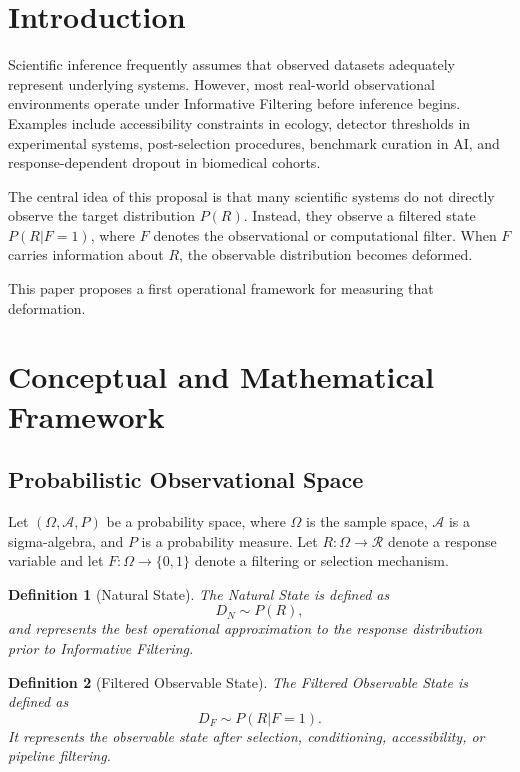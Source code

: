 \documentclass[11pt]{article}
\newtheorem{definition}{Definition}
\begin{document}
\section{Introduction}

Scientific inference frequently assumes that observed datasets adequately represent underlying systems. However, most real-world observational environments operate under Informative Filtering before inference begins. Examples include accessibility constraints in ecology, detector thresholds in experimental systems, post-selection procedures, benchmark curation in AI, and response-dependent dropout in biomedical cohorts.

The central idea of this proposal is that many scientific systems do not directly observe the target distribution $P(R)$. Instead, they observe a filtered state $P(R|F=1)$, where $F$ denotes the observational or computational filter. When $F$ carries information about $R$, the observable distribution becomes deformed.

This paper proposes a first operational framework for measuring that deformation.

\section{Conceptual and Mathematical Framework}

\subsection{Probabilistic Observational Space}

Let $(\Omega,\mathcal{A},P)$ be a probability space, where $\Omega$ is the sample space, $\mathcal{A}$ is a sigma-algebra, and $P$ is a probability measure. Let $R:\Omega\rightarrow\mathcal{R}$ denote a response variable and let $F:\Omega\rightarrow\{0,1\}$ denote a filtering or selection mechanism.

\begin{definition}[Natural State]
The Natural State is defined as
\[
D_N \sim P(R),
\]
and represents the best operational approximation to the response distribution prior to Informative Filtering.
\end{definition}

\begin{definition}[Filtered Observable State]
The Filtered Observable State is defined as
\[
D_F \sim P(R|F=1).
\]
It represents the observable state after selection, conditioning, accessibility, or pipeline filtering.
\end{definition}
\end{document}
